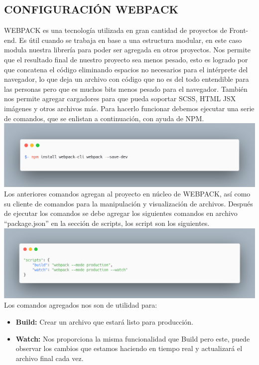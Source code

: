 \subsection{CONFIGURACIÓN WEBPACK}
WEBPACK es una tecnología utilizada en gran cantidad de proyectos de Front-end. Es útil cuando se trabaja en base a una estructura modular, en este caso modula nuestra librería para poder ser agregada en otros proyectos. Nos permite que el resultado final de nuestro proyecto sea menos pesado, esto es logrado por que concatena el código eliminando espacios no necesarios para el intérprete del navegador, lo que deja un archivo con código que no es del todo entendible para las personas pero que es muchos bits menos pesado para el navegador.
También nos permite agregar cargadores para que pueda soportar SCSS, HTML JSX imágenes y otros archivos más.
Para hacerlo funcionar debemos ejecutar una serie de comandos, que se enlistan a continuación, con ayuda de NPM.
\newline
\newline
\includegraphics[width=1\textwidth]{./Imagenes/image3.png}
\newline
\newline
Los anteriores comandos agregan al proyecto en núcleo de WEBPACK, así como su cliente de comandos para la manipulación y visualización de archivos. Después de ejecutar los comandos se debe agregar los siguientes comandos en archivo “package.json”  en la sección de scripts, los script son los siguientes.
\newline
\newline
\includegraphics[width=1\textwidth]{./Imagenes/image6.png}
\newline
\newline
Los comandos agregados nos son de utilidad para:
\begin{itemize}
\item \textbf{Build:} Crear un archivo que estará listo para producción.
\item \textbf{Watch:} Nos proporciona la misma funcionalidad que Build pero este, puede observar los cambios que estamos haciendo en tiempo real y actualizará el archivo final cada vez.
\end{itemize}
